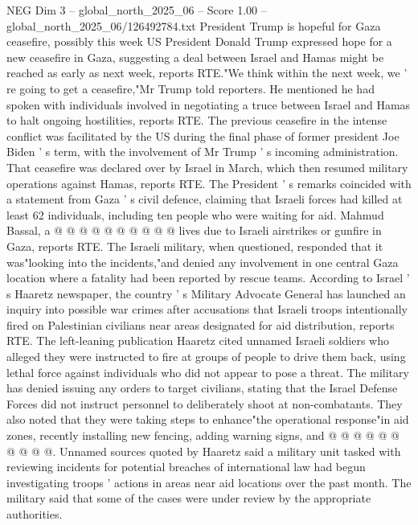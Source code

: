 \begin{textsample}{NEG Dim 3 – global\_north\_2025\_06 – Score 1.00 – global\_north\_2025\_06/126492784.txt}  \label{ex:f3_neg_361}
President Trump is hopeful for Gaza ceasefire, possibly this week US President Donald Trump expressed hope for a new ceasefire in Gaza, suggesting a deal between Israel and Hamas might be reached as early as next week, reports RTE."We think within the next week, we ' re going to get a ceasefire,"Mr Trump told reporters.
He mentioned he had spoken with individuals involved in negotiating a truce between Israel and Hamas to halt ongoing hostilities, reports RTE.
The previous ceasefire in the intense conflict was facilitated by the US during the final phase of former president Joe Biden ' s term, with the involvement of Mr Trump ' s incoming administration.
That ceasefire was declared over by Israel in March, which then resumed military operations against Hamas, reports RTE.
The President ' s remarks coincided with a statement from Gaza ' s civil defence, claiming that Israeli forces had killed at least 62 individuals, including ten people who were waiting for aid.
Mahmud Bassal, a @ @ @ @ @ @ @ @ @ @ lives due to Israeli airstrikes or gunfire in Gaza, reports RTE.
The Israeli military, when questioned, responded that it was"looking into the incidents,"and denied any involvement in one central Gaza location where a fatality had been reported by rescue teams.
According to Israel ' s Haaretz newspaper, the country ' s Military Advocate General has launched an inquiry into possible war crimes after accusations that Israeli troops intentionally fired on Palestinian civilians near areas designated for aid distribution, reports RTE.
The left-leaning publication Haaretz cited unnamed Israeli soldiers who alleged they were instructed to fire at groups of people to drive them back, using lethal force against individuals who did not appear to pose a threat.
The military has denied issuing any orders to target civilians, stating that the Israel Defense Forces did not instruct personnel to deliberately shoot at non-combatants.
They also noted that they were taking steps to enhance"the operational response"in aid zones, recently installing new fencing, adding warning signs, and @ @ @ @ @ @ @ @ @ @.
Unnamed sources quoted by Haaretz said a military unit tasked with reviewing incidents for potential breaches of international law had begun investigating troops ' actions in areas near aid locations over the past month.
The military said that some of the cases were under review by the appropriate authorities.

\end{textsample}
